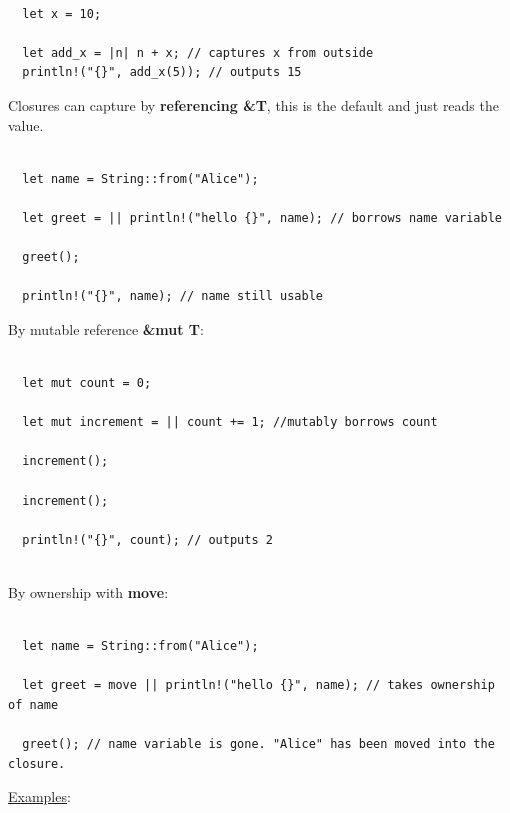 \documentclass[11pt]{article}
\begin{document}
\begin{verbatim}

  let x = 10;

  let add_x = |n| n + x; // captures x from outside
  println!("{}", add_x(5)); // outputs 15

\end{verbatim}

Closures can capture by \textbf{referencing \&T}, this is the default and just reads the value.

\begin{verbatim}

  let name = String::from("Alice");

  let greet = || println!("hello {}", name); // borrows name variable

  greet();
  
  println!("{}", name); // name still usable

\end{verbatim}

By mutable reference \textbf{\&mut T}:

\begin{verbatim}

  let mut count = 0;

  let mut increment = || count += 1; //mutably borrows count

  increment();

  increment();

  println!("{}", count); // outputs 2


\end{verbatim}

By ownership with \textbf{move}:

\begin{verbatim}

  let name = String::from("Alice");

  let greet = move || println!("hello {}", name); // takes ownership of name

  greet(); // name variable is gone. "Alice" has been moved into the closure.

\end{verbatim}

\uline{Examples}:
\end{document}
